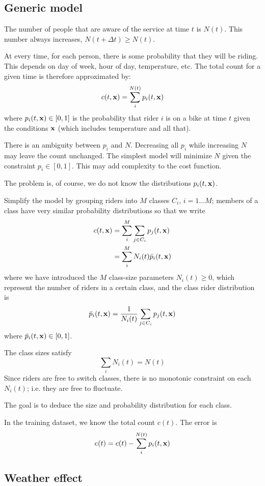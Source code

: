 \documentclass{article}
\newcommand{\bx}{{\bf x}}
\begin{document}
\subsection*{Generic model}

The number of people that are aware of the service at time $t$ is $N(t)$.
This number always increases, $N(t + \Delta t) \geq N(t)$.

At every time, for each person, there is some probability that they
will be riding. This depends on day of week, hour of day, temperature,
etc. The total count for a given time is therefore approximated by:
\[
c(t, \bx) = \sum_i^{N(t)} p_i(t, \bx)
\]
where $p_i(t, \bx) \in [0, 1]$ is the probability that rider $i$ is on
a bike at time $t$ given the conditions $\bx$ (which includes
temperature and all that).

There is an ambiguity between $p_i$ and $N$. Decreasing all $p_i$
while increasing $N$ may leave the count unchanged. The simplest model
will minimize $N$ given the constraint $p_i \in [0, 1]$. This may add
complexity to the cost function.

The problem is, of course, we do not know the distributions
$p_i(t, \bx)$.

Simplify the model by grouping riders into $M$ classes $C_i$, $i = 1
\ldots M$; members of a
class have very similar probability distributions so that we write
\begin{align*}
c(t, \bx) &= \sum_i^M \sum_{j \in C_i} p_{j}(t, \bx) \\
          &= \sum_i^M N_i(t) \bar{p}_i(t, \bx)
\end{align*}
where we have introduced the $M$ class-size parameters $N_i(t) \geq 0$,
which represent
the number of riders in a certain class, and the class rider distribution
is
\[
\bar{p}_i(t, \bx) = \frac{1}{N_i(t)} \sum_{j \in C_i} p_{j}(t, \bx)
\]
where $\bar{p}_i(t, \bx) \in [0, 1]$.

The class sizes satisfy
\[
\sum_i N_i(t) = N(t)
\]
Since riders are free to switch classes, there is no monotonic
constraint on each $N_i(t)$; i.e. they are free to fluctuate.

The goal is to deduce the size and probability distribution for each
class.

In the training dataset, we know the total count
$c(t)$. The error is
\[
e(t) = c(t) - \sum_i^{N(t)} p_i(t, \bx)
\]

\subsection*{Weather effect}
\end{document}
